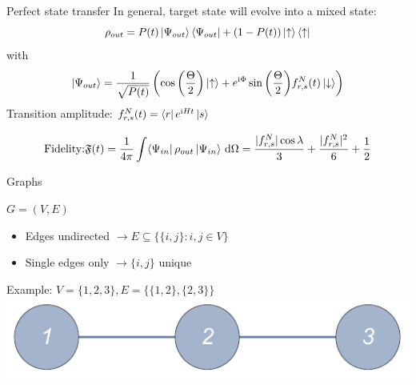 \documentclass{beamer}
\begin{document}
\begin{frame}{Perfect state transfer}
	In general, target state will evolve into a mixed state:\\
	\[ \rho_{out} = P(t)\ket{\Psi_{out}}\bra{\Psi_{out}} + \left( 1-P(t) \right)\ket{\uparrow}\bra{\uparrow} \]
	with
	\[ \ket{\Psi_{out}} = \frac{1}{\sqrt{P(t)}}\left( \cos{\left(\frac{\Theta}{2}\right)} \ket{\uparrow} + e^{\text{i}\Phi}\sin{\left(\frac{\Theta}{2}\right)}f^N_{r,s}(t)\ket{\downarrow} \right) \]
	Transition amplitude: $f^N_{r,s}(t) = \bra{r}e^{\text{i}H t}\ket{s}$\\
	\begin{exampleblock}{}
	\setlength\abovedisplayskip{-8pt}
	\begin{center}
		\[ \text{Fidelity:}\mathfrak{F}(t) = \frac{1}{4\pi}\int \!\bra{\Psi_{in}}\rho_{out}\ket{\Psi_{in}} \, \mathrm{d}\Omega = \frac{\lvert f^N_{r,s}\rvert\cos{\lambda}}{3} + \frac{\lvert f^N_{r,s}\rvert^2}{6} + \frac{1}{2}\]
	\end{center}
	\end{exampleblock}
\end{frame}

\begin{frame}[t]{Graphs}
	\begin{exampleblock}{}
	\setlength\abovedisplayskip{-8pt}
	\begin{center}
		$G = (V,E)$
	\end{center}
	\end{exampleblock}
	\begin{itemize}
		\item Edges undirected $\rightarrow E \subseteq \{\{i,j\}\colon i,j \in V\}$
		\item Single edges only $\rightarrow \{i,j\}$ unique
	\end{itemize}   
	Example: $V = \{1,2,3\}, E = \{\{1,2\},\{2,3\}\}$
		\includegraphics[trim=0 0 0 -5mm, width=\textwidth]{Images/chain3}
\end{frame}
\end{document}
